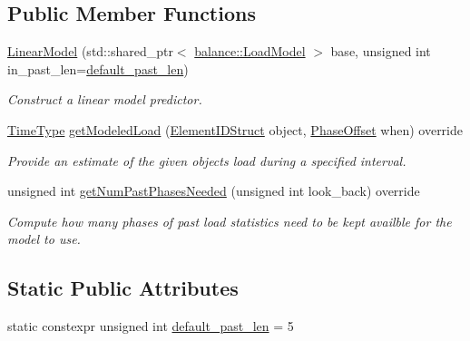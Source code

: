 \subsection*{Public Member Functions}
\begin{DoxyCompactItemize}
\item 
\hyperlink{structvt_1_1vrt_1_1collection_1_1balance_1_1_linear_model_a90fff488014731417431b35295a263d7}{Linear\+Model} (std\+::shared\+\_\+ptr$<$ \hyperlink{structvt_1_1vrt_1_1collection_1_1balance_1_1_load_model}{balance\+::\+Load\+Model} $>$ base, unsigned int in\+\_\+past\+\_\+len=\hyperlink{structvt_1_1vrt_1_1collection_1_1balance_1_1_linear_model_a5735a20dfd17fb2804a1b9b90d5649d1}{default\+\_\+past\+\_\+len})
\begin{DoxyCompactList}\small\item\em Construct a linear model predictor. \end{DoxyCompactList}\item 
\hyperlink{namespacevt_a876a9d0cd5a952859c72de8a46881442}{Time\+Type} \hyperlink{structvt_1_1vrt_1_1collection_1_1balance_1_1_linear_model_a4590c5f8dd94c31e51cd16c24dbb7888}{get\+Modeled\+Load} (\hyperlink{namespacevt_1_1vrt_1_1collection_1_1balance_a9f5b53fafb270212279a4757d2c4cd28}{Element\+I\+D\+Struct} object, \hyperlink{structvt_1_1vrt_1_1collection_1_1balance_1_1_phase_offset}{Phase\+Offset} when) override
\begin{DoxyCompactList}\small\item\em Provide an estimate of the given object\textquotesingle{}s load during a specified interval. \end{DoxyCompactList}\item 
unsigned int \hyperlink{structvt_1_1vrt_1_1collection_1_1balance_1_1_linear_model_a454177a512bbb73e246d3a7ad823c8e4}{get\+Num\+Past\+Phases\+Needed} (unsigned int look\+\_\+back) override
\begin{DoxyCompactList}\small\item\em Compute how many phases of past load statistics need to be kept availble for the model to use. \end{DoxyCompactList}\end{DoxyCompactItemize}
\subsection*{Static Public Attributes}
\begin{DoxyCompactItemize}
\item 
static constexpr unsigned int \hyperlink{structvt_1_1vrt_1_1collection_1_1balance_1_1_linear_model_a5735a20dfd17fb2804a1b9b90d5649d1}{default\+\_\+past\+\_\+len} = 5
\end{DoxyCompactItemize}
